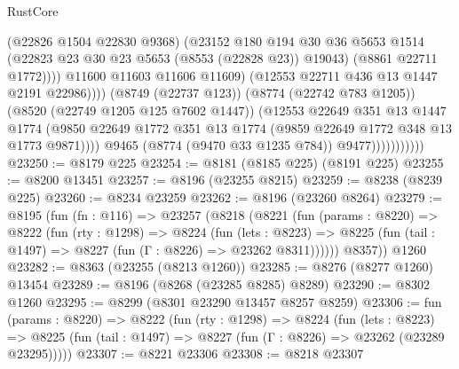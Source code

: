 \begin{lexlean}{RustCore}
\begin{coremodule}
                                        (@22826 @1504 @22830 @9368)
                                        (@23152
                                          @180
                                          @194
                                          @30
                                          @36
                                          @5653
                                          @1514
                                          (@22823 @23 @30 @23 @5653 (@8553 (@22828 @23)) @19043)
                                          (@8861 @22711 @1772))))
                                    @11600
                                    @11603
                                    @11606
                                    @11609)
                                  (@12553 @22711 @436 @13 @1447 @2191 @22986))))
                            (@8749 (@22737 @123))
                            (@8774 (@22742 @783 @1205))
                            (@8520 (@22749 @1205 @125 @7602 @1447))
                            (@12553
                              @22649
                              @351
                              @13
                              @1447
                              @1774
                              (@9850
                                @22649
                                @1772
                                @351
                                @13
                                @1774
                                (@9859 @22649 @1772 @348 @13 @1773 @9871))))
                          @9465
                          (@8774 (@9470 @33 @1235 @784))
                          @9477)))))))))))
@23250 := @8179 @225
@23254 := @8181 (@8185 @225) (@8191 @225)
@23255 := @8200 @13451
@23257 := @8196 (@23255 @8215)
@23259 := @8238 (@8239 @225)
@23260 := @8234 @23259
@23262 := @8196 (@23260 @8264)
@23279 := @8195
    (fun (fn : @116) =>
    @23257
      (@8218
        (@8221
          (fun (params : @8220) =>
          @8222
            (fun (rty : @1298) =>
            @8224
              (fun (lets : @8223) =>
              @8225 (fun (tail : @1497) => @8227 (fun (Γ : @8226) => @23262 @8311))))))
        @8357))
    @1260
@23282 := @8363 (@23255 (@8213 @1260))
@23285 := @8276 (@8277 @1260) @13454
@23289 := @8196 (@8268 (@23285 @8285) @8289)
@23290 := @8302 @1260
@23295 := @8299 (@8301 @23290 @13457 @8257 @8259)
@23306 := fun (params : @8220) =>
  @8222
    (fun (rty : @1298) =>
    @8224
      (fun (lets : @8223) =>
      @8225 (fun (tail : @1497) => @8227 (fun (Γ : @8226) => @23262 (@23289 @23295)))))
@23307 := @8221 @23306
@23308 := @8218 @23307

\end{coremodule}
\end{lexlean}
